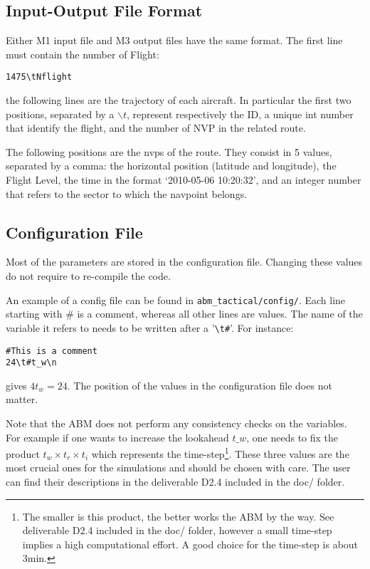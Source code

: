 \documentclass[12pt]{article}
\begin{document}
\subsection{Input-Output File Format}

Either M1 input file and M3 output files have the same format. The first line must contain the number of Flight:
\begin{verbatim}
1475\tNflight
\end{verbatim}
the following lines are the trajectory of each aircraft. In particular the first two positions, separated by a $\backslash t$,  represent respectively the ID, a unique int number that identify the flight, and the number of NVP in the related route. 

The following positions are the nvps of the route. They consist in 5 values, separated by a comma: the horizontal position (latitude and longitude), the Flight Level, the time in the format `2010-05-06 10:20:32', and an integer number that refers to the sector to which the navpoint belongs. 

\subsection{Configuration File}
Most of the parameters are stored in the configuration file. Changing these values do not require to re-compile the code. 

An example of a config file can be found in \verb|abm_tactical/config/|. Each line starting with $\#$ is a comment, whereas all other lines are values. The name of the variable it refers to needs to be written after a '\verb|\t#|'. For instance:
\begin{verbatim}
#This is a comment
24\t#t_w\n
\end{verbatim}
gives $4t_w = 24$. The position of the values in the configuration file does not matter.

Note that the ABM does not perform any consistency checks on the variables. For example if one wants to increase the lookahead $t\_w$, one needs to fix the product $t_w \times t_r \times t_i$ which represents the time-step\footnote{The smaller is this product, the better works the ABM by the way. See deliverable D2.4 included in the doc/ folder, however a small time-step implies a high computational effort. A good choice for the time-step is about 3min.}. These three values are the most crucial ones for the simulations and should be chosen with care. The user can find their descriptions in the deliverable D2.4 included in the doc/ folder.
\\
\end{document}
